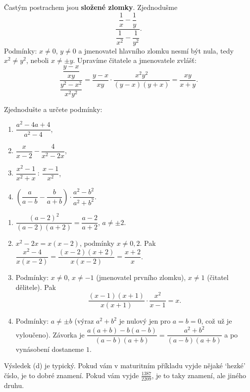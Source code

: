 \begin{example}
  Častým postrachem jsou \textbf{složené zlomky}. Zjednodušme
  \begin{equation*}
    \frac{\dfrac{1}{x} - \dfrac{1}{y}}{\dfrac{1}{x^2} - \dfrac{1}{y^2}}.
  \end{equation*}
  Podmínky: $x\neq 0$, $y\neq 0$ a jmenovatel hlavního zlomku nesmí být nula, tedy $x^2\neq y^2$, neboli $x\neq\pm y$. Upravíme čitatele a jmenovatele zvlášť:
  \begin{equation*}
    \frac{\dfrac{y - x}{xy}}{\dfrac{y^2 - x^2}{x^2y^2}} = \frac{y - x}{xy}\cdot\frac{x^2y^2}{(y - x)(y + x)} = \frac{xy}{x + y}.
  \end{equation*}
\end{example}

\begin{problem}
  Zjednodušte a určete podmínky:
  \begin{enumerate}[label=(\alph*)]
    \item $\dfrac{a^2 - 4a + 4}{a^2 - 4}$,
    \item $\dfrac{x}{x - 2} - \dfrac{4}{x^2 - 2x}$,
    \item $\dfrac{x^2 - 1}{x^2 + x}\ :\ \dfrac{x - 1}{x^2}$,
    \item $\left(\dfrac{a}{a - b} - \dfrac{b}{a + b}\right)\cdot\dfrac{a^2 - b^2}{a^2 + b^2}$.
  \end{enumerate}
\end{problem}

\begin{solution}
  \begin{enumerate}[label=(\alph*)]
    \item $\dfrac{{(a - 2)}^2}{(a - 2)(a + 2)} = \dfrac{a - 2}{a + 2}$, $a\neq\pm 2$.
    \item $x^2 - 2x = x(x - 2)$, podmínky $x\neq 0, 2$. Pak $\dfrac{x^2 - 4}{x(x - 2)} = \dfrac{(x - 2)(x + 2)}{x(x - 2)} = \dfrac{x + 2}{x}$.
    \item Podmínky: $x\neq 0$, $x\neq -1$ (jmenovatel prvního zlomku), $x\neq 1$ (čitatel dělitele). Pak
    \begin{equation*}
      \frac{(x - 1)(x + 1)}{x(x + 1)}\cdot\frac{x^2}{x - 1} = x.
    \end{equation*}
    \item Podmínky: $a\neq\pm b$ (výraz $a^2 + b^2$ je nulový jen pro $a = b = 0$, což už je vyloučeno). Závorka je $\dfrac{a(a + b) - b(a - b)}{(a - b)(a + b)} = \dfrac{a^2 + b^2}{(a - b)(a + b)}$ a po vynásobení dostaneme $1$.
  \end{enumerate}
  Výsledek (d) je typický. Pokud vám v maturitním příkladu vyjde nějaké `hezké' číslo, je to dobré znamení. Pokud vám vyjde $\frac{1387}{2209}$, je to taky znamení, ale jiného druhu.
\end{solution}

